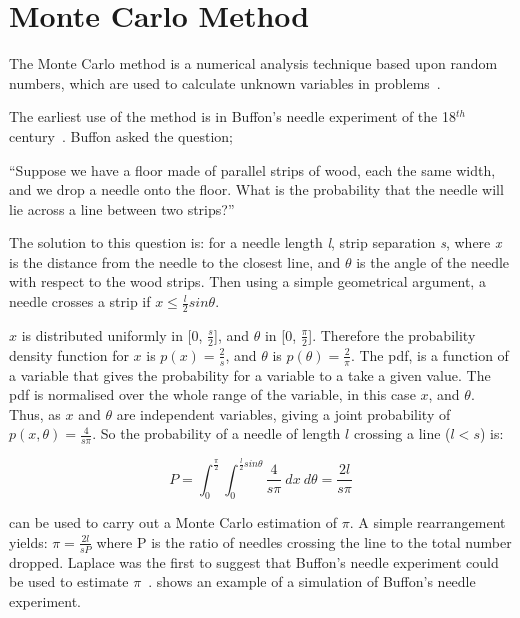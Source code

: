 \section{Monte Carlo Method}\label{sec:mcmethod}
The Monte Carlo method is a numerical analysis technique based upon random numbers, which are used to calculate unknown variables in problems~\cite{cashwell1959practical,rogers1990monte}. 

The earliest use of the method is in Buffon's needle experiment of the 18$^{th}$ century~\cite{badger1994lazzarini,beckmann2015history,buffon1785histoire}. Buffon asked the question;

\medskip

``Suppose we have a floor made of parallel strips of wood, each the same width, and we drop a needle onto the floor. What is the probability that the needle will lie across a line between two strips?''

\medskip

The solution to this question is:
for a needle length \textit{l}, strip separation \textit{s}, where \textit{x} is the distance from the needle to the closest line, and $\theta$ is the angle of the needle with respect to the wood strips. Then using a simple geometrical argument, a needle crosses a strip if $x \leq \tfrac{l}{2} sin \theta$.

$x$ is distributed uniformly in [0, $\tfrac{s}{2}$], and $\theta$ in [0, $\tfrac{\pi}{2}$]. Therefore the probability density function for $x$ is $p(x)=\tfrac{2}{s}$, and $\theta$ is $p(\theta) = \tfrac{2}{\pi}$. The \gls*{pdf}, is a function of a variable that gives the probability for a variable to a take a given value. The \gls*{pdf} is normalised over the whole range of the variable, in this case $x$, and $\theta$.
Thus, as $x$ and $\theta$ are independent variables, giving a joint probability of $p(x,\theta) = \tfrac{4}{s \pi}$.
So the probability of a needle of length $l$ crossing a line ($l<s$) is:

\begin{equation}
P=\int_0^{\frac{\pi}{2}}\int_0^{\frac{l}{2}sin\theta}\frac{4}{s\pi}\ dx\ d\theta = \frac{2 l}{s \pi}\label{eqn:buffon}
\end{equation}


 can be used to carry out a Monte Carlo estimation of $\pi$. A simple rearrangement yields: $\pi = \tfrac{2l}{sP}$ where P is the ratio of needles crossing the line to the total number dropped. Laplace was the first to suggest that Buffon's needle experiment could be used to estimate $\pi$~\cite{beckmann2015history}. 
 shows an example of a simulation of Buffon's needle experiment.

